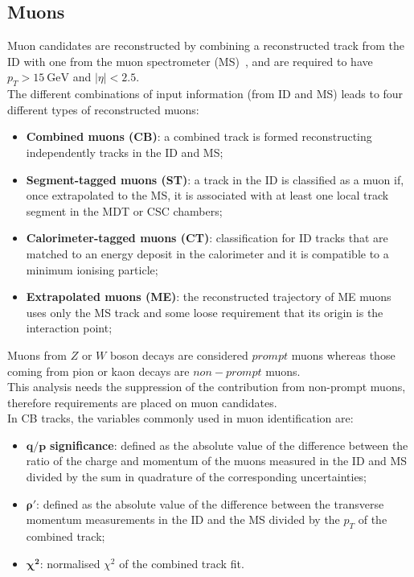 \subsection{Muons}
\label{sec:object:mu}
Muon candidates are reconstructed by combining a reconstructed track
from the ID with one from the muon spectrometer
(MS)~\cite{PERF-2015-10}, and are required to have $p_{T}>\SI{15}{\GeV}$
and $|\eta|<2.5$. \\
The different combinations of input information (from ID and MS) leads to four different
types of reconstructed muons:
\begin{itemize}
\item \textbf{Combined muons (CB)}: a combined track is formed reconstructing independently tracks in the ID and MS;
\item \textbf{Segment-tagged muons (ST)}: a track in the ID is classified as a muon if, once
extrapolated to the MS, it is associated with at least one local track segment
in the MDT or CSC chambers;
\item \textbf{Calorimeter-tagged muons (CT)}: classification for ID tracks that are matched to an 
energy deposit in the calorimeter and it is compatible to a minimum ionising particle;
\item \textbf{Extrapolated muons (ME)}: the reconstructed trajectory of ME muons uses only the
MS track and some loose requirement that its origin is the interaction point;
\end{itemize}
Muons from $Z$ or $W$ boson decays are considered $prompt$ muons whereas those
coming from pion or kaon decays are $non-prompt$ muons. \\
This analysis needs the suppression of the contribution from non-prompt muons, therefore 
requirements are placed on muon candidates. \\
In CB tracks, the variables commonly used in muon identification are:
\begin{itemize}
	\item $\bm{q/p}$ \textbf{significance}: defined as the absolute value of the difference between the
ratio of the charge and momentum of the muons measured in the ID and MS
divided by the sum in quadrature of the corresponding uncertainties;
	\item $\bm{\rho'}$: defined as the absolute value of the difference between the transverse momentum
measurements in the ID and the MS divided by the $p_T$ of the combined
track;
	\item $\bm{\chi^2}$: normalised $\chi^2$ of the combined track fit.
\end{itemize}
